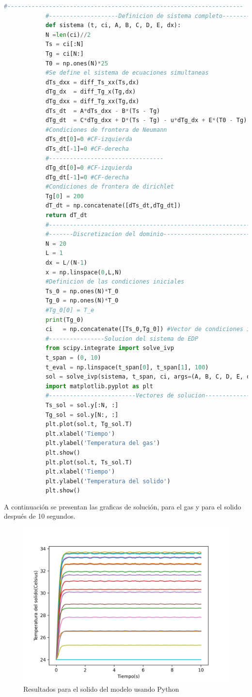 \documentclass[12pt,letterpaper,final]{article}%
\begin{document}
\begin{lstlisting}[language=Python]
			#--------------------------------------------------------------------
			#--------------------Definicion de sistema completo------------------
			def sistema (t, ci, A, B, C, D, E, dx):
			N =len(ci)//2
			Ts = ci[:N]
			Tg = ci[N:]
			T0 = np.ones(N)*25
			#Se define el sistema de ecuaciones simultaneas
			dTs_dxx = diff_Ts_xx(Ts,dx)
			dTg_dx  = diff_Tg_x(Tg,dx)
			dTg_dxx = diff_Tg_xx(Tg,dx)
			dTs_dt  = A*dTs_dxx - B*(Ts - Tg)
			dTg_dt  = C*dTg_dxx + D*(Ts - Tg) - u*dTg_dx + E*(T0 - Tg)
			#Condiciones de frontera de Neumann
			dTs_dt[0]=0 #CF-izquierda 
			dTs_dt[-1]=0 #CF-derecha
			#---------------------------------
			dTg_dt[0]=0 #CF-izquierda
			dTg_dt[-1]=0 #CF-derecha
			#Condiciones de frontera de dirichlet
			Tg[0] = 200
			dT_dt = np.concatenate([dTs_dt,dTg_dt])
			return dT_dt
			#--------------------------------------------------------------------
			#-------Discretizacion del dominio-------------------------
			N = 20
			L = 1
			dx = L/(N-1)
			x = np.linspace(0,L,N)
			#Definicion de las condiciones iniciales
			Ts_0 = np.ones(N)*T_0
			Tg_0 = np.ones(N)*T_0
			#Tg_0[0] = T_e
			print(Tg_0)
			ci   = np.concatenate([Ts_0,Tg_0]) #Vector de condiciones iniciales
			#----------------Solucion del sistema de EDP
			from scipy.integrate import solve_ivp
			t_span = (0, 10)
			t_eval = np.linspace(t_span[0], t_span[1], 100)
			sol = solve_ivp(sistema, t_span, ci, args=(A, B, C, D, E, dx), t_eval=t_eval, method='RK45')
			import matplotlib.pyplot as plt
			#-------------------------Vectores de solucion----------------------
			Ts_sol = sol.y[:N, :]
			Tg_sol = sol.y[N:, :]
			plt.plot(sol.t, Tg_sol.T)
			plt.xlabel('Tiempo')
			plt.ylabel('Temperatura del gas')
			plt.show()
			plt.plot(sol.t, Ts_sol.T)
			plt.xlabel('Tiempo')
			plt.ylabel('Temperatura del solido')
			plt.show()
		\end{lstlisting}
		A continuación se presentan las graficas de solución, para el gas y para el solido después de 10 segundos.
		\begin{figure}[ht!]
			\includegraphics[scale=0.6]{temp_solido_lopez.png}
			\caption{Resultados para el solido del modelo usando Python}
		\end{figure}
\end{document}

